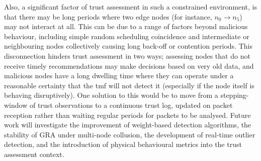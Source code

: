 Also, a significant factor of trust assessment in such a constrained environment, is that there may be long periods where two edge nodes (for instance, $n_0 \to n_5$) may not interact at all. 
This can be due to a range of factors beyond malicious behaviour, including simple random scheduling coincidence and intermediate or neighbouring nodes collectively causing long back-off or contention periods.
This disconnection hinders trust assessment in two ways; assessing nodes that do not receive timely recommendations may make decisions based on very old data, and malicious nodes have a long dwelling time where they can operate under a reasonable certainty that the \gls{tmf} will not detect it (especially if the node itself is behaving disruptively).
One solution to this would be to move from a stepping-window of trust observations to a continuous trust log, updated on packet reception rather than waiting regular periods for packets to be analysed.
Future work will investigate the improvement of weight-based detection algorithms, the stability of GRA under multi-node collusion, the development of real-time outlier detection, and the introduction of physical behavioural metrics into the trust assessment context.





